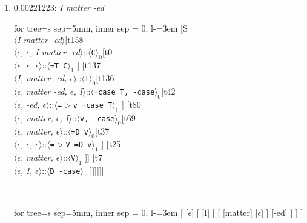 \documentclass[11pt]{article}
\begin{document}
\begin{enumerate}
	\item  0.00221223: \textit{I matter -ed} \\[0.5em]
	\begin{adjustbox}{max width = \textwidth}
	\begin{forest}
	for tree={s sep=5mm, inner sep = 0, l-=3em}
	[S\\$\langle$\textit{I matter -ed}$\rangle$[t158\\$\langle$\textit{$\epsilon${,} $\epsilon${,} I matter -ed}$\rangle$::$\langle$\texttt{C}$\rangle_0$[t0\\$\langle$\textit{$\epsilon${,} $\epsilon${,} $\epsilon$}$\rangle$::$\langle$\texttt{{=}T C}$\rangle_1$ ] [t137\\$\langle$\textit{I{,} matter -ed{,} $\epsilon$}$\rangle$::$\langle$\texttt{T}$\rangle_0$[t136\\$\langle$\textit{$\epsilon${,} matter -ed{,} $\epsilon${,} I}$\rangle$::$\langle$\texttt{+case T{,} -case}$\rangle_0$[t42\\$\langle$\textit{$\epsilon${,} -ed{,} $\epsilon$}$\rangle$::$\langle$\texttt{{=}$>$v +case T}$\rangle_1$ ] [t80\\$\langle$\textit{$\epsilon${,} matter{,} $\epsilon${,} I}$\rangle$::$\langle$\texttt{v{,} -case}$\rangle_0$[t69\\$\langle$\textit{$\epsilon${,} matter{,} $\epsilon$}$\rangle$::$\langle$\texttt{{=}D v}$\rangle_0$[t37\\$\langle$\textit{$\epsilon${,} $\epsilon${,} $\epsilon$}$\rangle$::$\langle$\texttt{{=}$>$V {=}D v}$\rangle_1$ ] [t25\\$\langle$\textit{$\epsilon${,} matter{,} $\epsilon$}$\rangle$::$\langle$\texttt{V}$\rangle_1$ ]] [t7\\$\langle$\textit{$\epsilon${,} I{,} $\epsilon$}$\rangle$::$\langle$\texttt{D -case}$\rangle_1$ ]]]]]]
	\end{forest}
	\end{adjustbox}
	\\
	\begin{adjustbox}{max width = \textwidth}
	\begin{forest}
	for tree={s sep=5mm, inner sep = 0, l-=3em}
	[ [$\epsilon$] [ [I] [ [ [matter] [$\epsilon$] ] [-ed] ] ] ]
	\end{forest}
	\end{adjustbox}
	\newpage


\end{enumerate}
\end{document}
